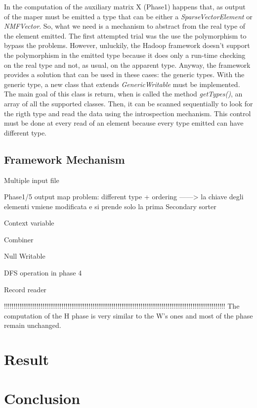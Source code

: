 \documentclass[a4paper,12pt]{article}
\newcommand{\METHOD}[1] {\textit{#1}}
\newcommand{\CLASS}[1] {\textit{#1}}
\begin{document}
In the computation of the auxiliary matrix X (Phase1) happens that, as output of the maper must be emitted a type that can be either a \CLASS{SparseVectorElement} or \CLASS{NMFVector}. So, what we need is a mechanism to abstract from the real type of the element emitted. The first attempted trial was the use the polymorphism to bypass the problems. However, unluckily, the Hadoop framework doesn't support the polymorphism in the emitted type because it does only a run-time checking on the real type and not, as usual, on the apparent type. Anyway, the framework provides a solution that can be used in these cases: the generic types. With the generic type, a new class that extends \CLASS{GenericWritable} must be implemented. The main goal of this class is return, when is called the method \METHOD{getTypes()}, an array of all the supported classes. Then, it can be scanned sequentially to look for the rigth type and read the data using the introspection mechanism. This control must be done at every read of an element because every type emitted can have different type.



\subsection{Framework Mechanism}

Multiple input file


Phase1/5 output map problem: different type + ordering ------> la chiave degli elementi vmiene modificata e si prende solo la prima
Secondary sorter



Context variable



Combiner

Null Writable

DFS operation in phase 4

Record reader





!!!!!!!!!!!!!!!!!!!!!!!!!!!!!!!!!!!!!!!!!!!!!!!!!!!!!!!!!!!!!!!!!!!!!!!!!!!!!!!!!!!!!!!!!!!!!!!!!!!!!!!!!!!!!!!!!!!
The computation of the H phase is very similar to the W's ones and
most of the phase remain unchanged.
 

\section{Result}

\section{Conclusion}



\nocite{*}




\end{document}
